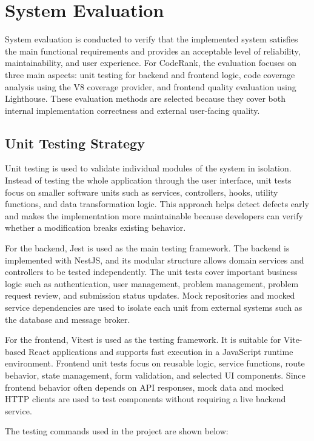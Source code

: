 \section{System Evaluation}

System evaluation is conducted to verify that the implemented system satisfies the main functional requirements and provides an acceptable level of reliability, maintainability, and user experience. For CodeRank, the evaluation focuses on three main aspects: unit testing for backend and frontend logic, code coverage analysis using the V8 coverage provider, and frontend quality evaluation using Lighthouse. These evaluation methods are selected because they cover both internal implementation correctness and external user-facing quality.

\subsection{Unit Testing Strategy}

Unit testing is used to validate individual modules of the system in isolation. Instead of testing the whole application through the user interface, unit tests focus on smaller software units such as services, controllers, hooks, utility functions, and data transformation logic. This approach helps detect defects early and makes the implementation more maintainable because developers can verify whether a modification breaks existing behavior.

For the backend, Jest is used as the main testing framework. The backend is implemented with NestJS, and its modular structure allows domain services and controllers to be tested independently. The unit tests cover important business logic such as authentication, user management, problem management, problem request review, and submission status updates. Mock repositories and mocked service dependencies are used to isolate each unit from external systems such as the database and message broker.

For the frontend, Vitest is used as the testing framework. It is suitable for Vite-based React applications and supports fast execution in a JavaScript runtime environment. Frontend unit tests focus on reusable logic, service functions, route behavior, state management, form validation, and selected UI components. Since frontend behavior often depends on API responses, mock data and mocked HTTP clients are used to test components without requiring a live backend service.

The testing commands used in the project are shown below:

